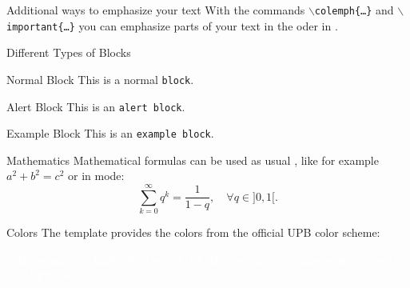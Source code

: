 \documentclass[
	] {beamer}
\begin{document}
\begin{frame}{Additional ways to emphasize your text}
	With the commands \texttt{$\backslash$colemph\{\ldots\}} and
	\texttt{$\backslash$important\{\ldots\}} you can emphasize parts of your text
	in the  oder in .
\end{frame}



\begin{frame}{Different Types of Blocks}
	\begin{block}{Normal Block}
		This is a normal \texttt{block}.
	\end{block}

	\begin{alertblock}{Alert Block}
		This is an \texttt{alert block}.
	\end{alertblock}

	\begin{exampleblock}{Example Block}
		This is an \texttt{example block}.
	\end{exampleblock}
\end{frame}



\begin{frame}{Mathematics}
	Mathematical formulas can be used as usual , like for example
	\(a^2+b^2 = c^2\) or in  mode:
	\[\sum\limits_{k=0}^\infty q^k = \frac{1}{1-q}, \quad \forall q \in ]0,1[.\]
\end{frame}



\begin{frame}{Colors}
	The template provides the colors from the official UPB color scheme:

	\colorbox{upbblue}{\textcolor{white}{\texttt{upbblue}}}
	\colorbox{upbgray}{\textcolor{white}{\texttt{upbgray}}}
	\colorbox{upblightgray}{\textcolor{white}{\texttt{upblightgray}}}
	\colorbox{upbred}{\textcolor{white}{\texttt{upbred}}}
	\colorbox{upbgreen}{\textcolor{white}{\texttt{upbgreen}}}
	\colorbox{upbcyan}{\textcolor{white}{\texttt{upbcyan}}}
	\colorbox{upborange}{\textcolor{white}{\texttt{upborange}}}
	\colorbox{upbcassis}{\textcolor{white}{\texttt{upbcassis}}}
	\colorbox{upblightblue}{\textcolor{white}{\texttt{upblightblue}}}
\end{frame}
\end{document}
